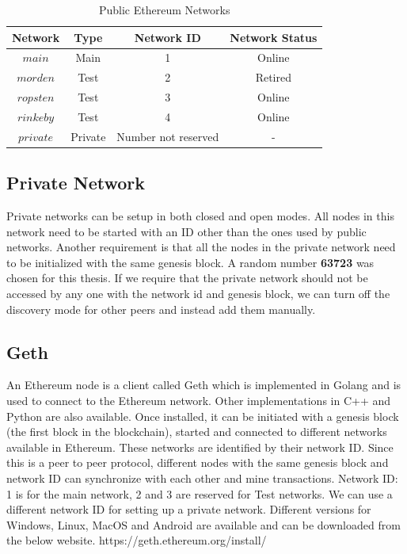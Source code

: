 \documentclass[11pt,openright]{report}
\begin{document}
\begin{table}[!htbp]
	\renewcommand{\arraystretch}{1.3}
	\caption{Public Ethereum Networks}
	\label{pub_eth_networks}
	\centering
	\begin{tabular}{|c||c|c|c|}
		\hline
		\bfseries Network & \bfseries Type & \bfseries Network ID & \bfseries Network Status \\
		\hline\hline
		$main$ & Main & 1 & Online \\ \hline
		$morden$ & Test & 2 & Retired \\ \hline
		$ropsten$ & Test & 3 & Online \\ \hline
		$rinkeby$ & Test & 4 & Online \\ \hline
		$private$ & Private & Number not reserved & - \\ \hline

	\end{tabular}
\end{table}

\subsection{Private Network}
Private networks can be setup in both closed and open modes. All nodes in this network need to be started with an ID other than the ones used by public networks. Another requirement is that all the nodes in the private network need to be initialized with the same genesis block. A random number \textbf{63723} was chosen for this thesis. If we require that the private network should not be accessed by any one with the network id and genesis block, we can turn off the discovery mode for other peers and instead add them manually.

\subsection{Geth}
An Ethereum node is a client called Geth which is implemented in Golang and is used to connect to the Ethereum network. Other implementations in C++ and Python are also available. Once installed, it can be initiated with a genesis block (the first block in the blockchain), started and connected to different networks available in Ethereum. These networks are identified by their network ID. Since this is a peer to peer protocol, different nodes with the same genesis block and network ID can synchronize with each other and mine transactions. Network ID: 1 is for the main network, 2 and 3 are reserved for Test networks. We can use a different network ID for setting up a private network. Different versions for Windows, Linux, MacOS and Android are available and can be downloaded from the below website.
https://geth.ethereum.org/install/
\end{document}

